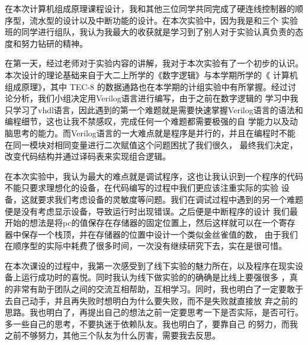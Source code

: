 在本次计算机组成原理课程设计，我和其他三位同学共同完成了硬连线控制器的顺序型，流水型的设计以及中断功能的设计。在本次实验中，因为我是和三个
实验班的同学进行组队，我认为我最大的收获就是学习到了别人对于实验认真负责的态度和努力钻研的精神。
\par  
在第一天，经过老师对于实验内容的讲解，我对于本次实验有了一个初步的认识。本次设计的理论基础来自于大二上所学的《数字逻辑》与本学期所学的《
计算机组成原理》，其中 TEC-8 的数据通路也在本学期的计组实验中有所掌握。经过讨论分析，我们小组决定用Verilog语言进行编写，由于之前在数字逻辑的
学习中我只学习了vhdl语言，因此遇到的第一个难题就是需要快速掌握Verilog语言的语法和编程细节，这也让我不禁感叹，完成任何一个难题都需要极强的自
学能力以及动脑思考的能力。而Verilog语言的一大难点就是程序是并行的，并且在编程时不能在同一模块对相同变量进行二次赋值这个问题困扰了我们很久，
最终我们决定，改变代码结构并通过译码表来实现组合逻辑。
\par 
在本次实验中，我认为最大的难点就是调试程序，这也让我认识到一个程序的代码不能只要求理想化的设备，在代码编写的过程中我们更应该注重实际的实验
设备，这就要求我们考虑设备的灵敏度等问题。我们在调试过程中遇到的另一个难题便是没有考虑显示设备，导致运行时出现错误。之后便是中断程序的设计
我们最开始的想法是将pc的值保存在存储器的固定位置上，然后这样就可以在一个寄存器中保存一个栈顶，并在存储器的位置中设计一个类似金丝雀值的数，
由于我们在顺序型的实际中耗费了很多时间，一次没有继续研究下去，实在是很可惜。
\par 
在本次课设的过程中，我第一次感受到了线下实验的魅力所在，以及程序在现实设备上运行成功时的喜悦。同时我认为线下做实验的的确确是比线上要强很多
，真的非常有助于团队之间的交流互相帮助，互相学习。同时，我也明白了一定要敢于去自己动手，并且再失败时想明白为什么要失败，而不是失败就直接放
弃之前的思路。我也明白了，再提出自己的想法之前一定要思考一下是否实际，是否可行。多一些自己的思考，不要执迷于依赖队友。我也明白了，要靠自己
的努力，而我之前不够努力，其他三个队友为什么厉害，需要我去反思。
